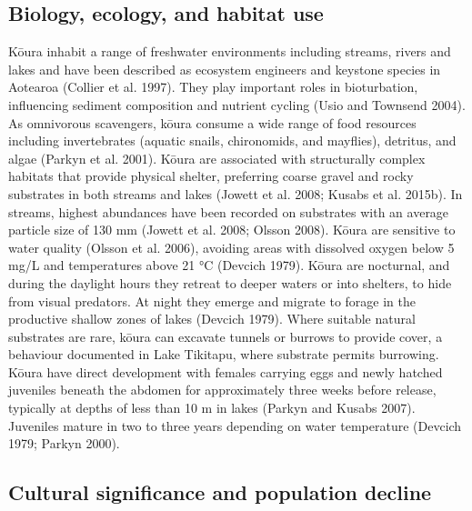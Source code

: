 \documentclass[
  12pt,
  a4paper,
  oneside]{scrbook}
\begin{document}
\subsection{Biology, ecology, and habitat
use}\label{biology-ecology-and-habitat-use}

Kōura inhabit a range of freshwater environments including streams,
rivers and lakes and have been described as ecosystem engineers and
keystone species in Aotearoa (Collier et al. 1997). They play important
roles in bioturbation, influencing sediment composition and nutrient
cycling (Usio and Townsend 2004). As omnivorous scavengers, kōura
consume a wide range of food resources including invertebrates (aquatic
snails, chironomids, and mayflies), detritus, and algae (Parkyn et al.
2001). Kōura are associated with structurally complex habitats that
provide physical shelter, preferring coarse gravel and rocky substrates
in both streams and lakes (Jowett et al. 2008; Kusabs et al. 2015b). In
streams, highest abundances have been recorded on substrates with an
average particle size of 130 mm (Jowett et al. 2008; Olsson 2008). Kōura
are sensitive to water quality (Olsson et al. 2006), avoiding areas with
dissolved oxygen below 5 mg/L and temperatures above 21 °C (Devcich
1979). Kōura are nocturnal, and during the daylight hours they retreat
to deeper waters or into shelters, to hide from visual predators. At
night they emerge and migrate to forage in the productive shallow zones
of lakes (Devcich 1979). Where suitable natural substrates are rare,
kōura can excavate tunnels or burrows to provide cover, a behaviour
documented in Lake Tikitapu, where substrate permits burrowing. Kōura
have direct development with females carrying eggs and newly hatched
juveniles beneath the abdomen for approximately three weeks before
release, typically at depths of less than 10 m in lakes (Parkyn and
Kusabs 2007). Juveniles mature in two to three years depending on water
temperature (Devcich 1979; Parkyn 2000).

\subsection{Cultural significance and population
decline}\label{cultural-significance-and-population-decline}
\end{document}
